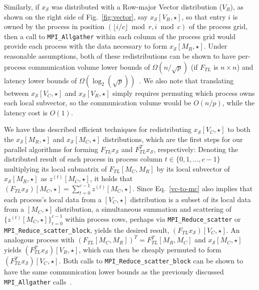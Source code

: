 


Similarly, if $x_{\mathcal{S}}$ was distributed with a Row-major Vector 
distribution ($V_R$), as shown on the right side of Fig.~\ref{fig:vector}, 
say $x_{\mathcal{S}}[V_R,\star]$, so that 
entry $i$ is owned by the process in position 
$(\lfloor i/c \rfloor \bmod r,i \bmod c)$ of the process grid, then a call to
\verb!MPI_Allgather! within each column of the process grid would provide 
each process with the data necessary to form $x_{\mathcal{S}}[M_R,\star]$.
Under reasonable assumptions, both of these redistributions can be shown to 
have per-process communication volume lower bounds of $\Omega(n/\sqrt{p})$ 
(if $F_{TL}$ is $n \times n$) and latency lower bounds of 
$\Omega(\log_2(\sqrt{p}))$~\cite{Chan-collective}. 
We also note that translating between $x_{\mathcal{S}}[V_C,\star]$ and 
$x_{\mathcal{S}}[V_R,\star]$ simply requires permuting which process owns each 
local subvector, so the communication volume would be $O(n/p)$, 
while the latency cost is $O(1)$.

We have thus described efficient techniques for redistributing 
$x_{\mathcal{S}}[V_C,\star]$ to both the $x_{\mathcal{S}}[M_R,\star]$ and 
$x_{\mathcal{S}}[M_C,\star]$ distributions, which are the first steps 
for our parallel algorithms for forming $F_{TL} x_{\mathcal{S}}$ and 
$F_{TL}^T x_{\mathcal{S}}$, respectively: Denoting the distributed result of 
each process in process column $t \in \{0,1,...,c-1\}$ multiplying its local 
submatrix of $F_{TL}[M_C,M_R]$ by its local subvector of 
$x_{\mathcal{S}}[M_R,\star]$ as $z^{(t)}[M_C,\star]$, it holds that 
$(F_{TL} x_{\mathcal{S}})[M_C,\star] = \sum_{t=0}^{c-1} z^{(t)}[M_C,\star]$.
Since Eq.\ \eqref{vc-to-mc} also implies that each process's local data 
from a $[V_C,\star]$ distribution is a subset of its local data from a 
$[M_C,\star]$ distribution, a simultaneous summation and scattering of 
$\{z^{(t)}[M_C,\star]\}_{t=0}^{c-1}$ within process rows, perhaps via 
\verb!MPI_Reduce_scatter! or \verb!MPI_Reduce_scatter_block!, yields the 
desired result, $(F_{TL} x_{\mathcal{S}})[V_C,\star]$. An analogous process
with $(F_{TL}[M_C,M_R])^T=F_{TL}^T[M_R,M_C]$ and $x_{\mathcal{S}}[M_C,\star]$ 
yields $(F_{TL}^T x_{\mathcal{S}})[V_R,\star]$, which can then be cheaply 
permuted to form $(F_{TL}^T x_{\mathcal{S}})[V_C,\star]$. Both calls to 
\verb!MPI_Reduce_scatter_block! can be shown to have the same communication 
lower bounds as the previously discussed \verb!MPI_Allgather! 
calls~\cite{Chan-collective}.

